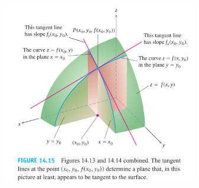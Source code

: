 \documentclass[oneside,12pt]{article}
\begin{document}

\newpage


\includegraphics[height=8cm]{2020-2-C3/2021mar18_thomas_11-1_fig_14.15.pdf}




\phantom{a}





\end{document}
